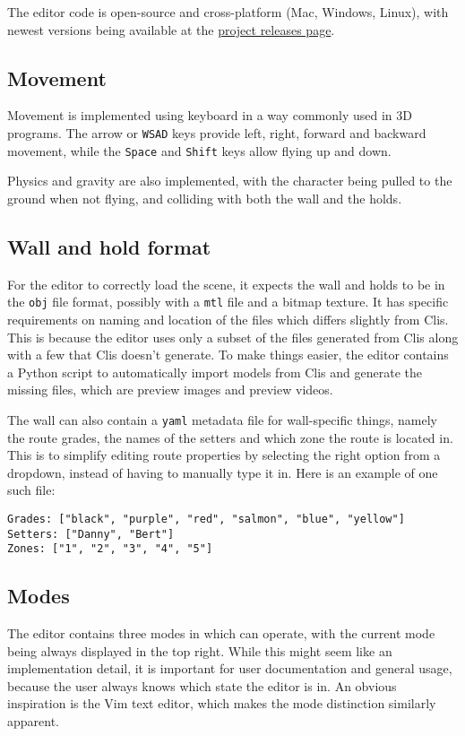 The editor code is open-source and cross-platform (Mac, Windows, Linux), with newest versions being available at the \href{https://github.com/Climber-Tools/Cled/releases}{project releases page}.

\subsection{Movement}
Movement is implemented using keyboard in a way commonly used in 3D programs.
The arrow or \verb|WSAD| keys provide left, right, forward and backward movement, while the \verb|Space| and \verb|Shift| keys allow flying up and down.

Physics and gravity are also implemented, with the character being pulled to the ground when not flying, and colliding with both the wall and the holds.

\subsection{Wall and hold format}
For the editor to correctly load the scene, it expects the wall and holds to be in the \verb|obj| file format, possibly with a \verb|mtl| file and a bitmap texture.
It has specific requirements on naming and location of the files which differs slightly from Clis.
This is because the editor uses only a subset of the files generated from Clis along with a few that Clis doesn't generate.
To make things easier, the editor contains a Python script to automatically import models from Clis and generate the missing files, which are preview images and preview videos.

The wall can also contain a \verb|yaml| metadata file for wall-specific things, namely the route grades, the names of the setters and which zone the route is located in.
This is to simplify editing route properties by selecting the right option from a dropdown, instead of having to manually type it in.
Here is an example of one such file:

\begin{verbatim}
Grades: ["black", "purple", "red", "salmon", "blue", "yellow"]
Setters: ["Danny", "Bert"]
Zones: ["1", "2", "3", "4", "5"]
\end{verbatim}

\subsection{Modes}
The editor contains three modes in which can operate, with the current mode being always displayed in the top right.
While this might seem like an implementation detail, it is important for user documentation and general usage, because the user always knows which state the editor is in.
An obvious inspiration is the Vim text editor, which makes the mode distinction similarly apparent.

